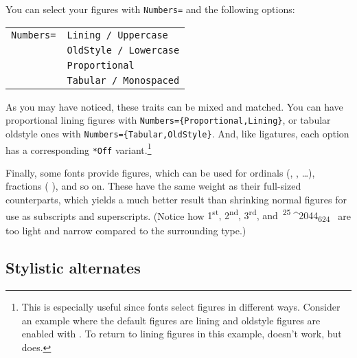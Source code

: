 You can select your figures with \verb|Numbers=| and the following options:
\begin{leftfigure}
\begin{tabular}{l l}
\texttt{Numbers=} & \texttt{Lining / Uppercase} \\
 & \texttt{OldStyle / Lowercase} \\
 & \texttt{Proportional} \\
 & \texttt{Tabular / Monospaced}
\end{tabular}
\end{leftfigure}
As you may have noticed, these traits can be mixed and matched.
You can have proportional lining figures
with \verb|Numbers={Proportional,Lining}|,
or tabular oldstyle ones with \verb|Numbers={Tabular,OldStyle}|.
And, like ligatures, each option has a corresponding \verb|*Off|
variant.\punckern\footnote{This is especially useful since fonts
select figures in different ways.
Consider an example where the default figures are lining
and oldstyle figures are enabled with
.
To return to lining figures in this example,
doesn't work, but
does.}

Finally, some fonts provide  figures,
which can be used for ordinals
(,  , \ldots),
fractions (\,\,), and so on.
These have the same weight as their full-sized counterparts,
which yields a much better result than shrinking normal figures for use as
subscripts and superscripts.
(Notice how
{%
\mbox{1\textsuperscript{st}},
\mbox{2\textsuperscript{nd}},
\mbox{3\textsuperscript{rd}},
and
\,\mbox{\textsuperscript{25}^^^^2044\textsubscript{624}}%
\,}
are too light and narrow compared to the surrounding type.)

\subsection{Stylistic alternates}
